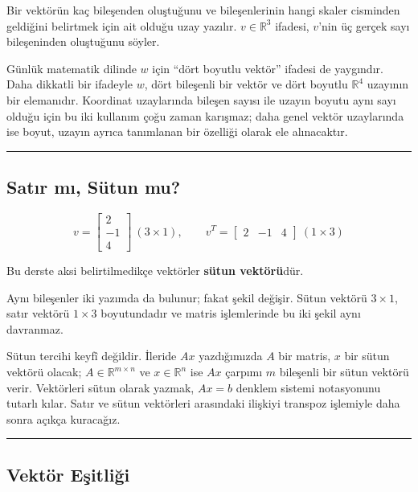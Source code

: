 \documentclass[
  a4paper,
  DIV=11,
  numbers=noendperiod]{scrartcl}
\begin{document}
Bir vektörün kaç bileşenden oluştuğunu ve bileşenlerinin hangi skaler
cisminden geldiğini belirtmek için ait olduğu uzay yazılır.
\(v\in\mathbb{R}^3\) ifadesi, \(v\)'nin üç gerçek sayı bileşeninden
oluştuğunu söyler.

Günlük matematik dilinde \(w\) için ``dört boyutlu vektör'' ifadesi de
yaygındır. Daha dikkatli bir ifadeyle \(w\), dört bileşenli bir vektör
ve dört boyutlu \(\mathbb{R}^4\) uzayının bir elemanıdır. Koordinat
uzaylarında bileşen sayısı ile uzayın boyutu aynı sayı olduğu için bu
iki kullanım çoğu zaman karışmaz; daha genel vektör uzaylarında ise
boyut, uzayın ayrıca tanımlanan bir özelliği olarak ele alınacaktır.

\begin{center}\rule{0.5\linewidth}{0.5pt}\end{center}

\subsection{Satır mı, Sütun mu?}\label{satux131r-mux131-suxfctun-mu}

\[
v=\begin{bmatrix}2\\-1\\4\end{bmatrix}\ (3\times1),
\qquad
v^T=\begin{bmatrix}2&-1&4\end{bmatrix}\ (1\times3)
\]

Bu derste aksi belirtilmedikçe vektörler \textbf{sütun vektörü}dür.

Aynı bileşenler iki yazımda da bulunur; fakat şekil değişir. Sütun
vektörü \(3\times1\), satır vektörü \(1\times3\) boyutundadır ve matris
işlemlerinde bu iki şekil aynı davranmaz.

Sütun tercihi keyfî değildir. İleride \(Ax\) yazdığımızda \(A\) bir
matris, \(x\) bir sütun vektörü olacak; \(A\in\mathbb{R}^{m\times n}\)
ve \(x\in\mathbb{R}^n\) ise \(Ax\) çarpımı \(m\) bileşenli bir sütun
vektörü verir. Vektörleri sütun olarak yazmak, \(Ax=b\) denklem sistemi
notasyonunu tutarlı kılar. Satır ve sütun vektörleri arasındaki ilişkiyi
transpoz işlemiyle daha sonra açıkça kuracağız.

\begin{center}\rule{0.5\linewidth}{0.5pt}\end{center}

\subsection{Vektör Eşitliği}\label{vektuxf6r-eux15fitliux11fi}
\end{document}

